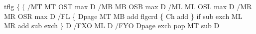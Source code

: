 \documentclass[11pt]{article}
\begin{document}
\nwenddocs{}\endmoddef
tflg \{ (%
  /MT MT OST max D  %
  /MB MB OSB max D  %
  /ML ML OSL max D  %
  /MR MR OSR max D  %
/FL \{            %
  Dpage          %
  MT MB add      %
  flgcrd \{       %
    Ch add       %
  \} if           %
  sub            %
  exch           %
  ML MR add sub  %
  exch           %
\} D              %
  /FXO ML D  %
  /FYO       %
    Dpage    %
    exch     %
    pop      %
    MT sub   %
  D          %
\eatline
\end{document}
